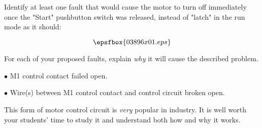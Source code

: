 

Identify at least one fault that would cause the motor to turn off immediately once the "Start" pushbutton switch was released, instead of "latch" in the run mode as it should:

$$\epsfbox{03896x01.eps}$$

For each of your proposed faults, explain {\it why} it will cause the described problem.







\medskip
\item{$\bullet$} M1 control contact failed open.
\vskip 5pt
\item{$\bullet$} Wire(s) between M1 control contact and control circuit broken open.
\medskip







This form of motor control circuit is {\it very} popular in industry.  It is well worth your students' time to study it and understand both how and why it works.




